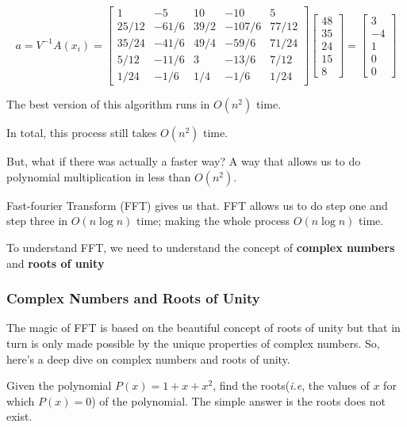 \documentclass[11pt]{article}
\begin{document}
\begin{enumerate}
  \[a = V^{-1}A(x_i) = \begin{bmatrix}1 & -5 & 10 & -10 & 5 \\ 25/12 & -61/6 & 39/2 & -107/6 & 77/12 \\ 35/24 & -41/6 & 49/4 & -59/6 & 71/24 \\5/12 & -11/6 & 3 & -13/6 & 7/12 \\1/24 & -1/6 & 1/4 & -1/6 & 1/24 \end{bmatrix} \begin{bmatrix}48 \\ 35 \\ 24 \\ 15 \\ 8 \end{bmatrix} = \begin{bmatrix}3 \\ -4 \\ 1 \\ 0 \\ 0\end{bmatrix}\]

  The best version of this algorithm runs in \(O(n^2)\) time.
\end{enumerate}

In total, this process still takes \(O(n^2)\) time.

But, what if there was actually a faster way? A way that allows us to do
polynomial multiplication in less than \(O(n^2)\).

Fast-fourier Transform (FFT) gives us that. FFT allows us to do step one
and step three in \(O(n\log n)\) time; making the whole process
\(O(n \log n)\) time.

To understand FFT, we need to understand the concept of \textbf{complex
numbers} and \textbf{roots of unity}

    \subsubsection{Complex Numbers and Roots of
Unity}\label{complex-numbers-and-roots-of-unity}

    The magic of FFT is based on the beautiful concept of roots of unity but
that in turn is only made possible by the unique properties of complex
numbers. So, here's a deep dive on complex numbers and roots of unity.

Given the polynomial \(P(x) = 1 + x + x^2\), find the roots(\emph{i.e},
the values of \(x\) for which \(P(x) = 0\)) of the polynomial. The
simple answer is the roots does not exist.
\end{document}
